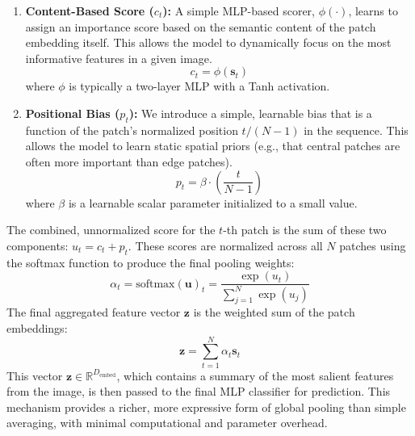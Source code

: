 \documentclass[12pt, a4paper]{article}
\begin{document}
\begin{enumerate}
    \item \textbf{Content-Based Score ($c_t$):} A simple MLP-based scorer, $\phi(\cdot)$, learns to assign an importance score based on the semantic content of the patch embedding itself. This allows the model to dynamically focus on the most informative features in a given image.
    \begin{equation}
    c_t = \phi(\mathbf{s}_t)
    \end{equation}
    where $\phi$ is typically a two-layer MLP with a Tanh activation.

    \item \textbf{Positional Bias ($p_t$):} We introduce a simple, learnable bias that is a function of the patch's normalized position $t/(N-1)$ in the sequence. This allows the model to learn static spatial priors (e.g., that central patches are often more important than edge patches).
    \begin{equation}
    p_t = \beta \cdot \left( \frac{t}{N-1} \right)
    \end{equation}
    where $\beta$ is a learnable scalar parameter initialized to a small value.
\end{enumerate}

The combined, unnormalized score for the $t$-th patch is the sum of these two components: $u_t = c_t + p_t$. These scores are normalized across all $N$ patches using the softmax function to produce the final pooling weights:
\begin{equation}
\alpha_t = \text{softmax}(\mathbf{u})_t = \frac{\exp(u_t)}{\sum_{j=1}^{N} \exp(u_j)}
\end{equation}
The final aggregated feature vector $\mathbf{z}$ is the weighted sum of the patch embeddings:
\begin{equation}
\mathbf{z} = \sum_{t=1}^{N} \alpha_t \mathbf{s}_t
\end{equation}
This vector $\mathbf{z} \in \mathbb{R}^{D_{\text{embed}}}$, which contains a summary of the most salient features from the image, is then passed to the final MLP classifier for prediction. This mechanism provides a richer, more expressive form of global pooling than simple averaging, with minimal computational and parameter overhead.

 

\end{document}
